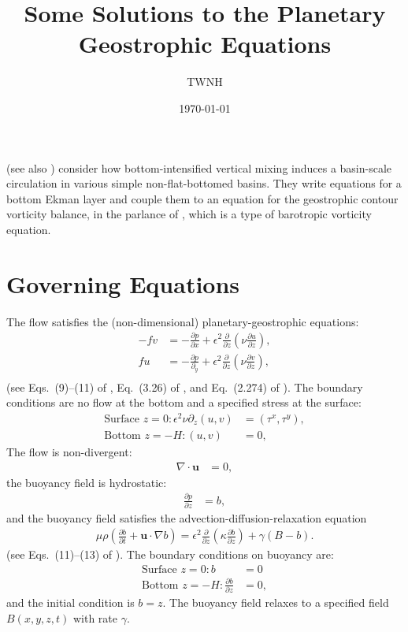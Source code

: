 \documentclass[10pt]{amsart}
\title{Some Solutions to the Planetary Geostrophic Equations}
\author{TWNH}
\date{\today}                                           %
\begin{document}
\maketitle

\citet{peterson&callies26} (see also \citealt{peterson&callies23}) consider how bottom-intensified vertical mixing induces a basin-scale circulation in various simple non-flat-bottomed basins.
They write equations for a bottom Ekman layer and couple them to an equation for the geostrophic contour vorticity balance, in the parlance of \citet{waldman&giordani23}, which is a type of barotropic vorticity equation.

\section{Governing Equations}
The flow satisfies the (non-dimensional) planetary-geostrophic equations:
\begin{align}
- f v & = - \frac{\partial p}{\partial x} + \epsilon^2 \frac{\partial}{\partial z} \left( \nu \frac{\partial u}{\partial z} \right), \label{eqn:u_mom} \\
f  u & = - \frac{\partial p}{\partial_y} + \epsilon^2 \frac{\partial}{\partial z} \left( \nu \frac{\partial v}{\partial z} \right),  \label{eqn:v_mom} \\
\end{align}
(see Eqs.~(9)--(11) of \citealt{peterson&callies26}, Eq.~(3.26) of \citealt{klinger&haine19}, and Eq.~(2.274) of \citealt{vallis06}).
The boundary conditions are no flow at the bottom and a specified stress at the surface:
\begin{align}
\text{Surface~}z = 0:
\epsilon^2 \nu \partial_z (u, v) & = (\tau^x , \tau^y ), 
 \\
\text{Bottom~}z = -H:
(u, v) & = 0 ,
\end{align}
The flow is non-divergent:
\begin{align}
\nabla \cdot {\mathbf u} & = 0 ,
\label{eqn:non-divergent}
\end{align}
the buoyancy field is hydrostatic:
\begin{align}
\frac{\partial p}{\partial z} & = b ,
\end{align}
and the buoyancy field satisfies the advection-diffusion-relaxation equation
\begin{align}
\mu \rho \left( \frac{\partial b}{\partial t} + {\mathbf u} \cdot \nabla b \right) = \epsilon^2 \frac{\partial }{\partial z} \left( \kappa \frac{\partial b}{\partial z} \right) + \gamma \left( B - b \right).
\label{eqn:b}
\end{align}
(see Eqs.~(11)--(13) of \citealt{peterson&callies26}).
The boundary conditions on buoyancy are:
\begin{align}
\text{Surface~}z = 0:
b &= 0
\label{eqn:sfc_b_bc}
 \\
\text{Bottom~}z = -H:
\frac{\partial b}{\partial z} &= 0 ,
\label{eqn:bot_b_bc}
\end{align}
and the initial condition is $b = z$.
The buoyancy field relaxes to a specified field $B(x, y, z, t)$ with rate $\gamma$.
\end{document}
